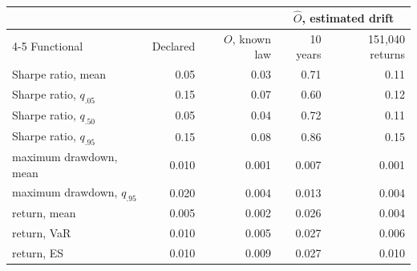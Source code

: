 \begin{tabular}{lrrrr}
\toprule
& & & \multicolumn{2}{c}{$\hat{O}$, estimated drift} \\
\cmidrule(lr){4-5}
Functional & Declared & $O$, known law & 10 years & 151{,}040 returns \\
\midrule
Sharpe ratio, mean & 0.05 & 0.03 & 0.71 & 0.11 \\
Sharpe ratio, $q_{.05}$ & 0.15 & 0.07 & 0.60 & 0.12 \\
Sharpe ratio, $q_{.50}$ & 0.05 & 0.04 & 0.72 & 0.11 \\
Sharpe ratio, $q_{.95}$ & 0.15 & 0.08 & 0.86 & 0.15 \\
maximum drawdown, mean & 0.010 & 0.001 & 0.007 & 0.001 \\
maximum drawdown, $q_{.95}$ & 0.020 & 0.004 & 0.013 & 0.004 \\
return, mean & 0.005 & 0.002 & 0.026 & 0.004 \\
return, VaR & 0.010 & 0.005 & 0.027 & 0.006 \\
return, ES & 0.010 & 0.009 & 0.027 & 0.010 \\
\bottomrule
\end{tabular}
